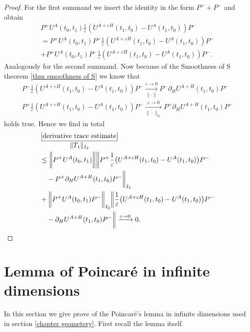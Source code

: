 \documentclass[b5paper,draft,openbib,12pt]{memoir}
\begin{document}
\begin{proof}
For the first summand we insert the identity in the 
form \(P^++P^-\) and obtain
\begin{align}
P^+ U^{A}(t_0,t_1) 
  \frac{1}{\varepsilon}\left(U^{A+\varepsilon H}(t_1,t_0)-U^{A}(t_1,t_0)\right)P^-\\
=P^+ U^{A}(t_0,t_1) P^+
\frac{1}{\varepsilon}\left(U^{A+\varepsilon H}(t_1,t_0)-U^{A}(t_1,t_0)\right)P^-\\
+P^+ U^{A}(t_0,t_1) P^-
\frac{1}{\varepsilon}\left(U^{A+\varepsilon H}(t_1,t_0)-U^{A}(t_1,t_0)\right)P^-.
\end{align}
Analogously for the second summand.
Now because of the Smoothness of S theorem 
\ref{thm smoothness of S}
we know that 
\begin{align}
  P^-
  \frac{1}{\varepsilon}\left(U^{A+\varepsilon H}(t_1,t_0)-U^{A}(t_1,t_0)\right)
  P^-\xrightarrow[\|\cdot\|]{\varepsilon\rightarrow 0} P^- \partial_H U^{A+H}(t_1,t_0)P^-\\
  P^+
  \frac{1}{\varepsilon}\left(U^{A+\varepsilon H}(t_1,t_0)-U^{A}(t_1,t_0)\right)
  P^-\xrightarrow[\|\cdot\|_{I_2}]{\varepsilon\rightarrow 0} P^+ \partial_H U^{A+H}(t_1,t_0)P^-
\end{align}
holds true. Hence we find in total 
\begin{align}
&\frac{\eqref{derivative trace estimate}}{\|T_1\|_{I_2}}\\
&\le \notag
\bigg\|  P^+ U^{A}(t_0,t_1)\bigg\| \bigg\| P^+
\frac{1}{\varepsilon}\big(U^{A+\varepsilon H}(t_1,t_0)-U^{A}(t_1,t_0)\big)P^- \\
&\quad- P^+\partial_{H}U^{A+H}(t_1,t_0)P^-\bigg\|_{I_2}\\
&+\bigg\|  P^+ U^{A}(t_0,t_1)P^- \bigg\|_{I_2} \bigg\|  \notag
\frac{1}{\varepsilon}\big(U^{A+\varepsilon H}(t_1,t_0)-U^{A}(t_1,t_0)\big)P^- \\
&\quad-\partial_{H}U^{A+H}(t_1,t_0)P^-\bigg\|\xrightarrow{\varepsilon \rightarrow 0} 0.
\end{align}

\end{proof}

\section{Lemma of Poincaré in infinite dimensions}\label{sec:proof of poincare}
In this section we give prove of the Poincaré's lemma 
in infinite dimensions used in section \ref{chapter geometery}.
First recall the lemma itself.
\end{document}
